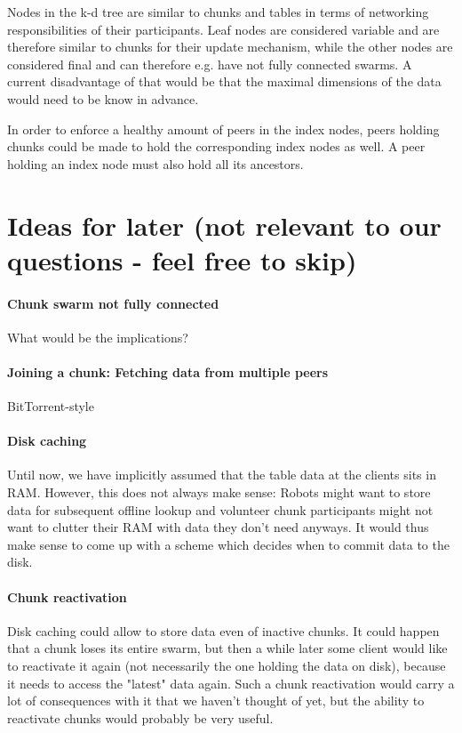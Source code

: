 \documentclass[a4paper, 10pt, conference]{ieeeconf}
\begin{document}
Nodes in the k-d tree are similar to chunks and tables in terms of networking
responsibilities of their participants. Leaf nodes are considered variable and
are therefore similar to chunks for their update mechanism, while the other
nodes are considered final and can therefore e.g. have not fully connected
swarms. A current disadvantage of that would be that the maximal dimensions of
the data would need to be know in advance.

In order to enforce a healthy amount of peers in the index nodes, peers holding
chunks could be made to hold the corresponding index nodes as well. A peer
holding an index node must also hold all its ancestors.

\section{Ideas for later (not relevant to our questions - feel free to skip)}

\paragraph{Chunk swarm not fully connected}
What would be the implications?

\paragraph{Joining a chunk: Fetching data from multiple peers} 
BitTorrent-style

\paragraph{Disk caching}
Until now, we have implicitly assumed that the table data at the clients sits
in RAM. However, this does not always make sense: Robots might want to store 
data for subsequent offline lookup and volunteer chunk participants might not
want to clutter their RAM with data they don't need anyways. It would thus make
sense to come up with a scheme which decides when to commit data to the disk.

\paragraph{Chunk reactivation}
Disk caching could allow to store data even of inactive chunks. It could happen
that a chunk loses its entire swarm, but then a while later some client would
like to reactivate it again (not necessarily the one holding the data on disk),
because it needs to access the "latest" data again. Such a chunk reactivation
would carry a lot of consequences with it that we haven't thought of yet, but 
the ability to reactivate chunks would probably be very useful.
\end{document}
